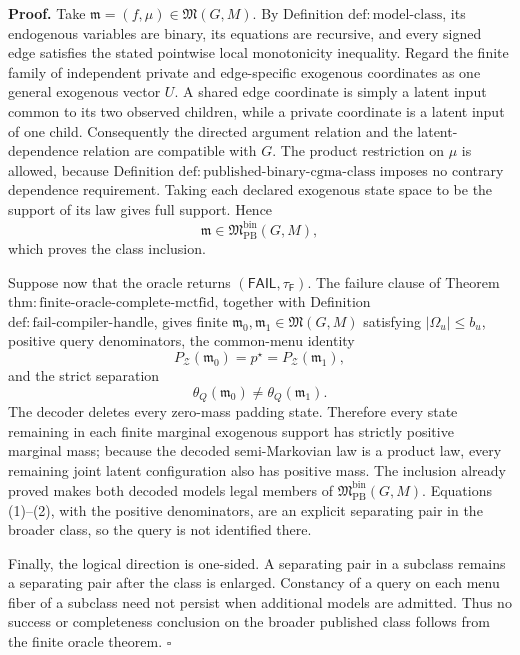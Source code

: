 \textbf{Proof.}
Take \(\mathfrak m=(f,\mu)\in\mathfrak M(G,M)\).  By Definition \(\mathrm{def:model\text{-}class}\), its endogenous variables are binary, its equations are recursive, and every signed edge satisfies the stated pointwise local monotonicity inequality.  Regard the finite family of independent private and edge-specific exogenous coordinates as one general exogenous vector \(U\).  A shared edge coordinate is simply a latent input common to its two observed children, while a private coordinate is a latent input of one child.  Consequently the directed argument relation and the latent-dependence relation are compatible with \(G\).  The product restriction on \(\mu\) is allowed, because Definition \(\mathrm{def:published\text{-}binary\text{-}cgma\text{-}class}\) imposes no contrary dependence requirement.  Taking each declared exogenous state space to be the support of its law gives full support.  Hence
\[
 \mathfrak m\in\mathfrak M_{\mathrm{PB}}^{\mathrm{bin}}(G,M),
\]
which proves the class inclusion.

Suppose now that the oracle returns \((\mathsf{FAIL},\tau_{\mathsf F})\).  The failure clause of Theorem \(\mathrm{thm:finite\text{-}oracle\text{-}complete\text{-}mctfid}\), together with Definition \(\mathrm{def:fail\text{-}compiler\text{-}handle}\), gives finite \(\mathfrak m_0,\mathfrak m_1\in\mathfrak M(G,M)\) satisfying \(|\Omega_u|\le b_u\), positive query denominators, the common-menu identity
\[
 P_{\mathcal Z}(\mathfrak m_0)=p^{\star}=P_{\mathcal Z}(\mathfrak m_1),
\tag{1}
\]
and the strict separation
\[
 \theta_Q(\mathfrak m_0)\ne\theta_Q(\mathfrak m_1).
\tag{2}
\]
The decoder deletes every zero-mass padding state.  Therefore every state remaining in each finite marginal exogenous support has strictly positive marginal mass; because the decoded semi-Markovian law is a product law, every remaining joint latent configuration also has positive mass.  The inclusion already proved makes both decoded models legal members of \(\mathfrak M_{\mathrm{PB}}^{\mathrm{bin}}(G,M)\).  Equations (1)--(2), with the positive denominators, are an explicit separating pair in the broader class, so the query is not identified there.

Finally, the logical direction is one-sided.  A separating pair in a subclass remains a separating pair after the class is enlarged.  Constancy of a query on each menu fiber of a subclass need not persist when additional models are admitted.  Thus no success or completeness conclusion on the broader published class follows from the finite oracle theorem. \(\square\)